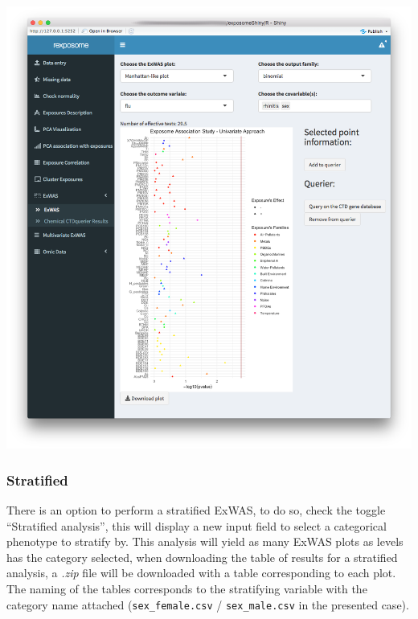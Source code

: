 \documentclass[
]{book}
\begin{document}
\includegraphics{images/analysis7_2.png}

\hypertarget{stratified}{%
\subsubsection{Stratified}\label{stratified}}

There is an option to perform a stratified ExWAS, to do so, check the toggle ``Stratified analysis'', this will display a new input field to select a categorical phenotype to stratify by. This analysis will yield as many ExWAS plots as levels has the category selected, when downloading the table of results for a stratified analysis, a \emph{.zip} file will be downloaded with a table corresponding to each plot. The naming of the tables corresponds to the stratifying variable with the category name attached (\texttt{sex\_female.csv} / \texttt{sex\_male.csv} in the presented case).
\end{document}
